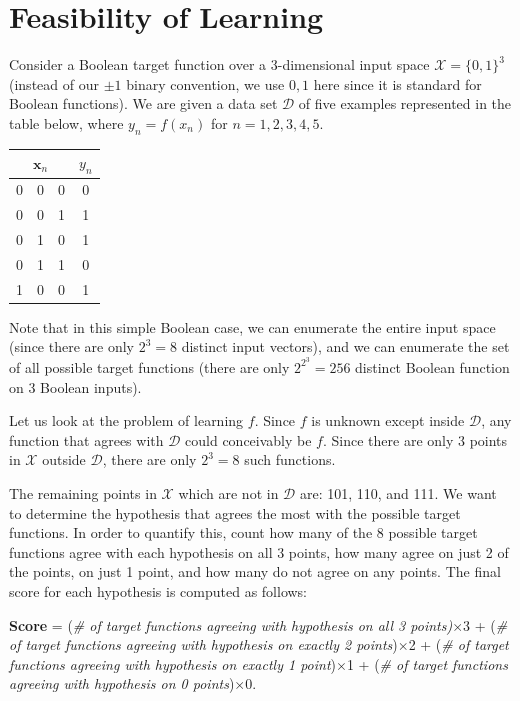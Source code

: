 \documentclass{article}
\begin{document}
\section{Feasibility of Learning}

Consider a Boolean target function over a 3-dimensional input space $\mathcal{X} = \{0, 1\}^3$ (instead of our $\pm1$ binary convention, we use $0, 1$ here since it is standard for Boolean functions). We are given a data set $\mathcal{D}$ of five examples represented in the table below, where $y_n = f(x_n)$ for $n = 1, 2, 3, 4, 5$.

\begin{center}
	\begin{tabular}{ccc||c}
		\multicolumn{3}{c||}{$\mathbf{x}_n$} & $y_n$ \\ \hline
		0 & 0 & 0 & 0 \\
		0 & 0 & 1 & 1 \\
		0 & 1 & 0 & 1 \\
		0 & 1 & 1 & 0 \\
		1 & 0 & 0 & 1 
	\end{tabular}
\end{center}

Note that in this simple Boolean case, we can enumerate the entire input space (since there are only $2^3 = 8$ distinct input vectors), and we can enumerate the set of all possible target functions (there are only $2^{2^3} = 256$ distinct Boolean function on 3 Boolean inputs).

Let us look at the problem of learning $f$. Since $f$ is unknown except inside $\mathcal{D}$, any function that agrees with $\mathcal{D}$ could conceivably be $f$. Since there are only 3 points in $\mathcal{X}$ outside $\mathcal{D}$, there are only $2^3 = 8$ such functions.

The remaining points in $\mathcal{X}$ which are not in $\mathcal{D}$ are: 101, 110, and 111. We want to determine the hypothesis that agrees the most with the possible target functions. In order to quantify this, count how many of the 8 possible target functions agree with each hypothesis on all 3 points, how many agree on just 2 of the points, on just 1 point, and how many do not agree on any points. The final score for each hypothesis is computed as follows:

\textbf{Score} = (\emph{\# of target functions agreeing with hypothesis on all 3 points)}$\times$3 + (\textit{\# of target functions agreeing with hypothesis on exactly 2 points})$\times$2 + (\textit{\# of target functions agreeing with hypothesis on exactly 1 point})$\times$1 + (\textit{\# of target functions agreeing with hypothesis on 0 points})$\times$0.
\end{document}
